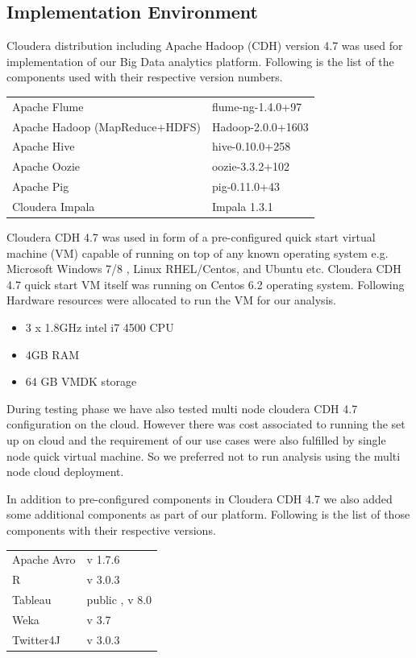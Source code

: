 \subsection{Implementation Environment} \label{env}
Cloudera distribution including Apache Hadoop (CDH) version 4.7 was used for implementation of our Big Data analytics platform. Following is the list of the components used with their respective version numbers.  
\begin{longtable}{@{}p{}p{}@{}}
Apache Flume & flume-ng-1.4.0+97 \\
Apache Hadoop (MapReduce\(+\)HDFS) & Hadoop-2.0.0+1603 \\ 
Apache Hive & hive-0.10.0+258 \\ 
Apache Oozie  & oozie-3.3.2+102 \\
Apache Pig & pig-0.11.0+43 \\ 
Cloudera Impala & Impala 1.3.1 
\end{longtable}
Cloudera CDH 4.7 was used in form of a pre-configured quick start virtual machine (VM) capable of running on top of any known operating system e.g. Microsoft Windows 7/8 , Linux RHEL/Centos, and Ubuntu etc. Cloudera CDH 4.7 quick start VM itself was running on Centos 6.2 operating system. Following Hardware resources were allocated to run the VM for our analysis.
\begin{itemize}
\item 3 x 1.8GHz intel i7 4500 CPU
\item 4GB RAM 
\item 64 GB VMDK storage
\end{itemize}
During testing phase we have also tested multi node cloudera CDH 4.7 configuration on the cloud. However there was cost associated to running the set up on cloud and the requirement of our use cases were also fulfilled by single node quick virtual machine. So we preferred not to run analysis using the multi node cloud deployment.

In addition to pre-configured components in Cloudera CDH 4.7 we also added some additional components as part of our platform. Following is the list of those components with their respective versions.
\begin{longtable}{@{}p{}p{}@{}}
Apache Avro & v 1.7.6 \\
R & v 3.0.3 \\ 
Tableau & public , v 8.0 \\ 
Weka  & v 3.7 \\
Twitter4J & v 3.0.3 
\end{longtable}

